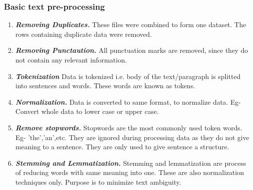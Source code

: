 \documentclass[runningheads]{llncs}
\begin{document}
\subsubsection{Basic text pre-processing}
\newline
\newline
\begin{enumerate}
\item \textbf{\emph{Removing Duplicates.}}
These files were combined to form one dataset. The rows containing duplicate data were removed. 
\newline
\newline
\item \textbf{\emph{Removing Punctaution.}}
All punctuation marks are removed, since they do not contain any relevant information.
\newline
\newline
\item \textbf{\emph{Tokenization}}
Data is tokenized i.e. body of the text/paragraph is splitted into sentences and words. These words are known as tokens.
\item \textbf{\emph{Normalization. }} 
Data is converted to same format, to normalize data.
Eg- Convert whole data to lower case or upper case.
\newline
\newline
\item \textbf{\emph{Remove stopwords. }}
Stopwords are the most commonly used token words. Eg- 'the','an',etc. They are ignored during processing data as they do not give meaning to a sentence. They are only used to give sentence a structure.
\newline
\newline
\item \textbf{\emph{Stemming and Lemmatization. }}
Stemming and lemmatization are process of reducing words with same meaning into one. These are also normalization techniques only. Purpose is to minimize text ambiguity.
\newline
\newline
\end{enumerate}
\end{document}
